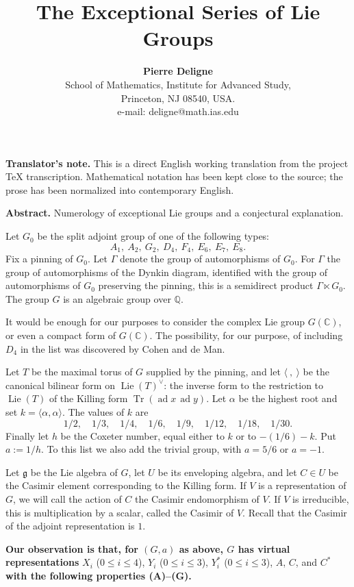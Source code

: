 \documentclass[11pt,a4paper]{article}
\title{\textbf{The Exceptional Series of Lie Groups}}
\author{\textbf{Pierre Deligne}\\[2pt]
\small School of Mathematics, Institute for Advanced Study,\\
\small Princeton, NJ 08540, USA.\\
\small e-mail: deligne@math.ias.edu}
\date{}
\DeclareMathOperator{\Tr}{Tr}
\DeclareMathOperator{\Lie}{Lie}
\DeclareMathOperator{\ad}{ad}
\newcommand{\frg}{\mathfrak{g}}
\newcommand{\C}{\mathbb{C}}
\newcommand{\Q}{\mathbb{Q}}
\begin{document}
\maketitle

\noindent\textbf{Translator's note.} This is a direct English working translation from the project TeX transcription. Mathematical notation has been kept close to the source; the prose has been normalized into contemporary English.

\medskip
\noindent\textbf{Abstract.} Numerology of exceptional Lie groups and a conjectural explanation.

\bigskip

Let $G_0$ be the split adjoint group of one of the following types:
\[
A_1,\ A_2,\ G_2,\ D_4,\ F_4,\ E_6,\ E_7,\ E_8.
\]
Fix a pinning of $G_0$. Let $\Gamma$ denote the group of automorphisms of $G_0$. For $\Gamma$ the group of automorphisms of the Dynkin diagram, identified with the group of automorphisms of $G_0$ preserving the pinning, this is a semidirect product $\Gamma \ltimes G_0$. The group $G$ is an algebraic group over $\Q$.

It would be enough for our purposes to consider the complex Lie group $G(\C)$, or even a compact form of $G(\C)$. The possibility, for our purpose, of including $D_4$ in the list was discovered by Cohen and de Man.

Let $T$ be the maximal torus of $G$ supplied by the pinning, and let $\langle\ ,\ \rangle$ be the canonical bilinear form on $\Lie(T)^\vee$: the inverse form to the restriction to $\Lie(T)$ of the Killing form $\Tr(\ad x\,\ad y)$. Let $\alpha$ be the highest root and set $k=\langle\alpha,\alpha\rangle$. The values of $k$ are
\[
1/2,\quad 1/3,\quad 1/4,\quad 1/6,\quad 1/9,\quad 1/12,\quad 1/18,\quad 1/30.
\]
Finally let $h$ be the Coxeter number, equal either to $k$ or to $-(1/6)-k$. Put $a:=1/h$. To this list we also add the trivial group, with $a=5/6$ or $a=-1$.

Let $\frg$ be the Lie algebra of $G$, let $U$ be its enveloping algebra, and let $C\in U$ be the Casimir element corresponding to the Killing form. If $V$ is a representation of $G$, we will call the action of $C$ the Casimir endomorphism of $V$. If $V$ is irreducible, this is multiplication by a scalar, called the Casimir of $V$. Recall that the Casimir of the adjoint representation is $1$.

\textbf{Our observation is that, for $(G,a)$ as above, $G$ has virtual representations}
$X_i$ ($0\leq i\leq 4$), $Y_i$ ($0\leq i\leq 3$), $Y_i^*$ ($0\leq i\leq 3$), $A$, $C$, and $C^*$
\textbf{with the following properties (A)--(G).}
\end{document}
